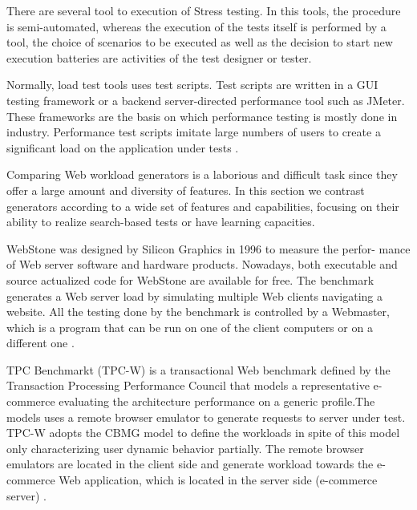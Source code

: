 There are several tool to execution of Stress testing. In this tools, the procedure is semi-automated, whereas the execution of the tests itself is performed by a tool, the choice of scenarios to be executed as well as the decision to start new execution batteries are activities of the test designer or tester.

Normally, load test tools uses test scripts. Test scripts are written in a GUI testing framework or a backend server-directed performance tool such as JMeter. These frameworks are the basis on which performance testing is mostly done in industry. Performance test scripts imitate large numbers of users to create a significant load on the application under tests \cite{Grechanik2012}.

Comparing Web workload generators is a laborious and difficult task since they offer a large amount and diversity of features. In this section we contrast generators according to a wide set of features and capabilities, focusing on their ability to realize search-based tests or have learning capacities.

WebStone was designed by Silicon Graphics in 1996 to measure the perfor- mance of Web server software and hardware products. Nowadays, both executable and source actualized code for WebStone are available for free. The benchmark generates a Web server load by simulating multiple Web clients navigating a website. All the testing done by the benchmark is controlled by a Webmaster, which is a program that can be run on one of the client computers or on a different one \cite{MohammadS.Obaidat} \cite{Trent1995} . 

TPC Benchmarkt (TPC-W) is a transactional Web benchmark defined by the Transaction Processing Performance Council that models a representative e-commerce evaluating the architecture performance on a generic profile.The models uses a remote browser emulator to generate requests to server under test. TPC-W adopts the CBMG model to define the workloads in spite of this model only characterizing user dynamic behavior partially. The remote browser emulators are located in the client side and generate workload towards the e-commerce Web application, which is located in the server side (e-commerce server) \cite{MohammadS.Obaidat} \cite{Menasce2002a}.

